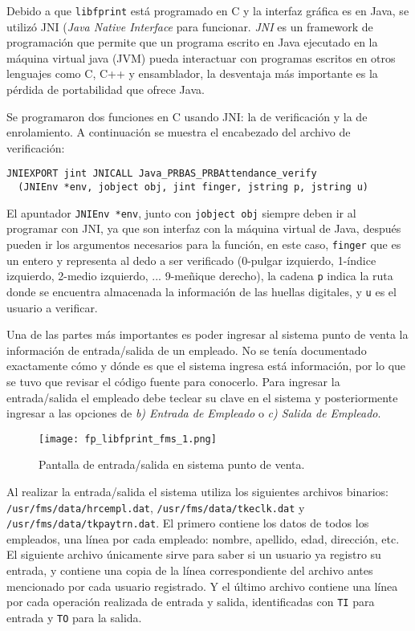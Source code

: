 Debido a que \texttt{libfprint} está programado en C y la interfaz gráfica es en Java, se utilizó JNI (\textit{Java Native Interface} para funcionar. \textit{JNI} es un framework de programación que permite que un programa escrito en Java ejecutado en la máquina virtual java (JVM) pueda interactuar con programas escritos en otros lenguajes como C, C++ y ensamblador, la desventaja más importante es la pérdida de portabilidad que ofrece Java.

Se programaron dos funciones en C usando JNI: la de verificación y la de enrolamiento. A continuación se muestra el encabezado del archivo de verificación:

\begin{Verbatim}
JNIEXPORT jint JNICALL Java_PRBAS_PRBAttendance_verify
  (JNIEnv *env, jobject obj, jint finger, jstring p, jstring u)
\end{Verbatim}

El apuntador \texttt{JNIEnv *env}, junto con \texttt{jobject obj} siempre deben ir al programar con JNI, ya que son interfaz con la máquina virtual de Java, después pueden ir los argumentos necesarios para la función, en este caso, \texttt{finger} que es un entero y representa al dedo a ser verificado (0-pulgar izquierdo, 1-índice izquierdo, 2-medio izquierdo, ... 9-meñique derecho), la cadena \texttt{p} indica la ruta donde se encuentra almacenada la información de las huellas digitales, y \texttt{u} es el usuario a verificar.

Una de las partes más importantes es poder ingresar al sistema punto de venta la información de entrada/salida de un empleado. No se tenía documentado exactamente cómo y dónde es que el sistema ingresa está información, por lo que se tuvo que revisar el código fuente para conocerlo. Para ingresar la entrada/salida el empleado debe teclear su clave en el sistema y posteriormente ingresar a las opciones de \textit{b) Entrada de Empleado} o \textit{c) Salida de Empleado}.

\begin{figure}[htb]
 \begin{center}
  \texttt{[image: fp\_libfprint\_fms\_1.png]}
 \end{center}
 \caption{Pantalla de entrada/salida en sistema punto de venta.}
 \label{fig:finger_print_4}
\end{figure}

Al realizar la entrada/salida el sistema utiliza los siguientes archivos binarios: \texttt{/usr/fms/data/hrcempl.dat}, \texttt{/usr/fms/data/tkeclk.dat} y \texttt{/usr/fms/data/tkpaytrn.dat}. El primero contiene los datos de todos los empleados, una línea por cada empleado: nombre, apellido, edad, dirección, etc. El siguiente archivo únicamente sirve para saber si un usuario ya registro su entrada, y contiene una copia de la línea correspondiente del archivo antes mencionado por cada usuario registrado. Y el último archivo contiene una línea por cada operación realizada de entrada y salida, identificadas con \texttt{TI} para entrada y \texttt{TO} para la salida.

